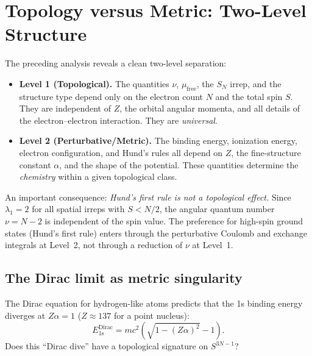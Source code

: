\documentclass[aps,prl,twocolumn,superscriptaddress,longbibliography]{revtex4-2}
\newcommand{\mufree}{\mu_{\mathrm{free}}}
\begin{document}

\section{Topology versus Metric: Two-Level Structure}
\label{sec:topology_vs_metric}

The preceding analysis reveals a clean two-level separation:

\begin{itemize}
  \item \textbf{Level 1 (Topological).}  The quantities $\nu$,
    $\mufree$, the $S_N$ irrep, and the structure type depend only
    on the electron count $N$ and the total spin $S$.  They are
    independent of $Z$, the orbital angular momenta, and all
    details of the electron--electron interaction.  They are
    \emph{universal}.

  \item \textbf{Level 2 (Perturbative/Metric).}  The binding energy,
    ionization energy, electron configuration, and Hund's rules all
    depend on $Z$, the fine-structure constant $\alpha$, and the
    shape of the potential.  These quantities determine the
    \emph{chemistry} within a given topological class.
\end{itemize}

An important consequence: \emph{Hund's first rule is not a topological
effect.}  Since $\lambda_1 = 2$ for all spatial irreps with $S < N/2$,
the angular quantum number $\nu = N - 2$ is independent of the spin
value.  The preference for high-spin ground states (Hund's first rule)
enters through the perturbative Coulomb and exchange integrals at
Level~2, not through a reduction of $\nu$ at Level~1.

\subsection{The Dirac limit as metric singularity}
\label{sec:dirac_limit}

The Dirac equation for hydrogen-like atoms predicts that the 1s
binding energy diverges at $Z\alpha = 1$ ($Z \approx 137$ for a point
nucleus):
\begin{equation}
  E_{\mathrm{1s}}^{\mathrm{Dirac}}
    = mc^2 \left(\sqrt{1 - (Z\alpha)^2} - 1\right).
  \label{eq:dirac_1s}
\end{equation}
Does this ``Dirac dive'' have a topological signature on $S^{3N-1}$?
\end{document}
